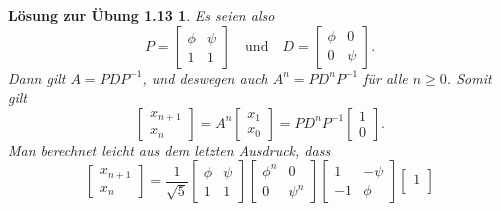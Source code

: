 \documentclass[a4paper,11pt,reqno]{amsart}
\theoremstyle{uremark}
\newtheorem*{loes}{L\"osung zur \"Ubung 1.13}
\begin{document}
\begin{loes}
        Es seien also
        \begin{equation*}%
            P = \begin{bmatrix}
                \phi & \psi \\
                1 & 1 
            \end{bmatrix} \quad \text{und} \quad D = \begin{bmatrix}
                \phi & 0 \\
                0 & \psi 
            \end{bmatrix}.
        \end{equation*}
        Dann gilt $ A = PDP^{-1} $, und deswegen auch $ A^n = PD^nP^{-1} $
        f\"ur alle $ n \ge 0 $. Somit gilt
        \begin{equation*}%
        \begin{bmatrix}
            x_{n + 1} \\
            x_n
        \end{bmatrix} = A^n
        \begin{bmatrix}
            x_1 \\
            x_{0}
        \end{bmatrix} = PD^n P^{-1}
        \begin{bmatrix}
            1 \\
            0
        \end{bmatrix}.
    \end{equation*}
    Man berechnet leicht aus dem letzten Ausdruck, dass 
    \begin{equation*}%
        \begin{bmatrix}
            x_{n + 1} \\
            x_n
        \end{bmatrix} = 
        \frac{1}{\sqrt{5}}\begin{bmatrix}
            \phi & \psi \\
            1 & 1 
        \end{bmatrix} \begin{bmatrix}
            \phi^n & 0 \\
            0 & \psi^n 
        \end{bmatrix} \begin{bmatrix}
            1 & -\psi \\
            -1 & \phi 
        \end{bmatrix} \begin{bmatrix}
            1 \\

\end{bmatrix}
\end{equation*}
\end{loes}
\end{document}
